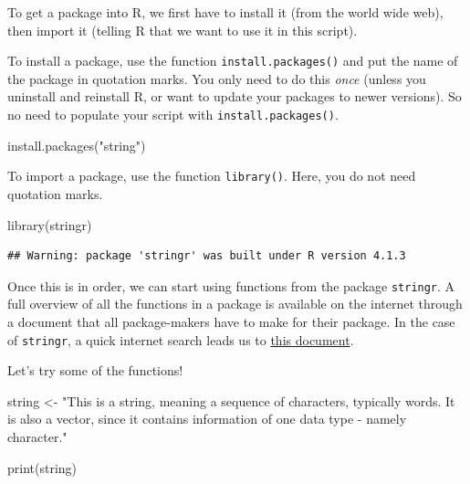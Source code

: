 \documentclass[
]{article}
\newenvironment{Shaded}{\begin{snugshade}}{\end{snugshade}}
\newcommand{\FunctionTok}[1]{\textcolor[rgb]{0.00,0.00,0.00}{#1}}
\newcommand{\NormalTok}[1]{#1}
\newcommand{\OtherTok}[1]{\textcolor[rgb]{0.56,0.35,0.01}{#1}}
\newcommand{\StringTok}[1]{\textcolor[rgb]{0.31,0.60,0.02}{#1}}
\begin{document}
To get a package into R, we first have to install it (from the world
wide web), then import it (telling R that we want to use it in this
script).

To install a package, use the function \texttt{install.packages()} and
put the name of the package in quotation marks. You only need to do this
\emph{once} (unless you uninstall and reinstall R, or want to update
your packages to newer versions). So no need to populate your script
with \texttt{install.packages()}.

\begin{Shaded}
\begin{Highlighting}[]
\FunctionTok{install.packages}\NormalTok{(}\StringTok{"string"}\NormalTok{)}
\end{Highlighting}
\end{Shaded}

To import a package, use the function \texttt{library()}. Here, you do
not need quotation marks.

\begin{Shaded}
\begin{Highlighting}[]
\FunctionTok{library}\NormalTok{(stringr)}
\end{Highlighting}
\end{Shaded}

\begin{verbatim}
## Warning: package 'stringr' was built under R version 4.1.3
\end{verbatim}

Once this is in order, we can start using functions from the package
\texttt{stringr}. A full overview of all the functions in a package is
available on the internet through a document that all package-makers
have to make for their package. In the case of \texttt{stringr}, a quick
internet search leads us to
\href{https://cran.r-project.org/web/packages/stringr/stringr.pdf}{this
document}.

Let's try some of the functions!

\begin{Shaded}
\begin{Highlighting}[]
\NormalTok{string }\OtherTok{\textless{}{-}} \StringTok{"This is a string, meaning a sequence of characters, typically words. It is also a vector, since it contains information of one data type {-} namely character."}

\FunctionTok{print}\NormalTok{(string)}
\end{Highlighting}
\end{Shaded}
\end{document}
